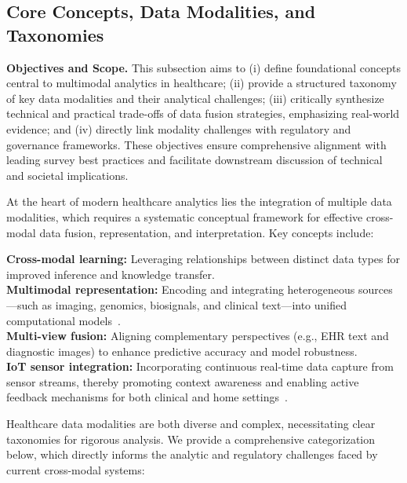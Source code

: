 \documentclass[sigconf]{acmart}
\begin{document}
\subsection{Core Concepts, Data Modalities, and Taxonomies}

\vspace{1ex}
\noindent\textbf{Objectives and Scope.} This subsection aims to (i) define foundational concepts central to multimodal analytics in healthcare; (ii) provide a structured taxonomy of key data modalities and their analytical challenges; (iii) critically synthesize technical and practical trade-offs of data fusion strategies, emphasizing real-world evidence; and (iv) directly link modality challenges with regulatory and governance frameworks. These objectives ensure comprehensive alignment with leading survey best practices and facilitate downstream discussion of technical and societal implications.

\vspace{1ex}
At the heart of modern healthcare analytics lies the integration of multiple data modalities, which requires a systematic conceptual framework for effective cross-modal data fusion, representation, and interpretation. Key concepts include:

\noindent\textbf{Cross-modal learning:} Leveraging relationships between distinct data types for improved inference and knowledge transfer.
\\
\textbf{Multimodal representation:} Encoding and integrating heterogeneous sources---such as imaging, genomics, biosignals, and clinical text---into unified computational models~\cite{ref16,ref17,ref18,ref25,ref28,ref29,ref30,ref67,ref68,ref70,ref90,ref106,ref107}.
\\
\textbf{Multi-view fusion:} Aligning complementary perspectives (e.g., EHR text and diagnostic images) to enhance predictive accuracy and model robustness.
\\
\textbf{IoT sensor integration:} Incorporating continuous real-time data capture from sensor streams, thereby promoting context awareness and enabling active feedback mechanisms for both clinical and home settings~\cite{ref90,ref106,ref107,ref68}.

\vspace{1ex}
Healthcare data modalities are both diverse and complex, necessitating clear taxonomies for rigorous analysis. We provide a comprehensive categorization below, which directly informs the analytic and regulatory challenges faced by current cross-modal systems:
\end{document}
